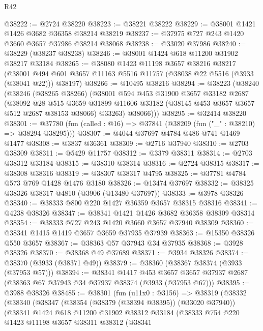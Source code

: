 \begin{lexlean}{R42}
\begin{coremodule}
@38222 := @2724 @38220
@38223 := @38221 @38222
@38229 := @38001 @1421 @1426 @3682 @36358 @38214 @38219
@38237 := @37975 @727 @243 @1420 @3660 @3657 @37986 @38214 @38068
@38238 := @33020 @37986
@38240 := @38229 (@38237 @38238)
@38246 := @38001 @1424 @618 @11200 @31902 @38217 @33184
@38265 := @38080
    @1423
    @11198
    @3657
    @38216
    @38217
    (@38001 @494 @601 @3657 @11163 @5516 @11757 (@38038 @22 @5516 (@3933 (@38041 @22))) @38197)
@38266 := @10495 @38216
@38294 := @38223
    (@38240
      (@38246
        (@38265 @38266)
        (@38001
          @594
          @453
          @31900
          @3657
          @33182
          @2687
          (@38092
            @28
            @515
            @3659
            @31899
            @11606
            @33182
            (@38145 @453 @3657 @3657 @512 @2687 @38153 @38066)
            @33263)
          @38066)))
@38295 := @32414 @38220
@38301 := @37780 (fun (called : @16) => @37841 (@38209 (fun ("_" : @38210) => @38294 @38295)))
@38307 := @4044 @37697 @4784 @486 @741 @1469 @1477
@38308 := @3837 @36361
@38309 := @2716 @37940
@38310 := @2703 @38309
@38311 := @5429 @11757
@38312 := @3379 @38311
@38314 := @2703 @38312 @33184
@38315 := @38310 @38314
@38316 := @2724 @38315
@38317 := @38308 @38316
@38319 := @38307 @38317 @4795
@38325 := @37781 @4784 @573 @769 @1428 @1476 @3180
@38326 := @13474 @37697
@38332 := @38325 @38326 @38317 @4810 (@3906 (@13480 @37697))
@38333 := @3978 @38326
@38340 := @38333 @800 @220 @1427 @36359 @3657 @38315 @38316
@38341 := @4238 @38326
@38347 := @38341 @1421 @1426 @3682 @36358 @38309 @38314
@38354 := @38333 @727 @243 @1420 @3660 @3657 @37940 @38309
@38360 := @38341 @1415 @1419 @3657 @3659 @37935 @37939
@38363 := @15350 @38326 @550 @3657
@38367 := @38363 @57 @37943 @34 @37935
@38368 := @3928 @38326
@38370 := @38368 @49 @37689
@38371 := @3934 @38326
@38374 := @38370 (@3933 (@38371 @49))
@38379 := @38360 (@38367 @38374 (@3933 (@37953 @57)))
@38394 := @38341
    @1417
    @453
    @3657
    @3657
    @37937
    @2687
    (@38363 @67 @37943 @34 @37937 @38374 (@3933 (@37953 @67)))
@38395 := @3988 @38326
@38485 := @38301
    (fun (u11x0 : @3156) =>
    @38319
      (@38332
        (@38340
          (@38347
            (@38354 (@38379 (@38394 @38395)) (@33020 @37940))
            (@38341
              @1424
              @618
              @11200
              @31902
              @38312
              @33184
              (@38333
                @754
                @220
                @1423
                @11198
                @3657
                @38311
                @38312
                (@38341

\end{coremodule}
\end{lexlean}
